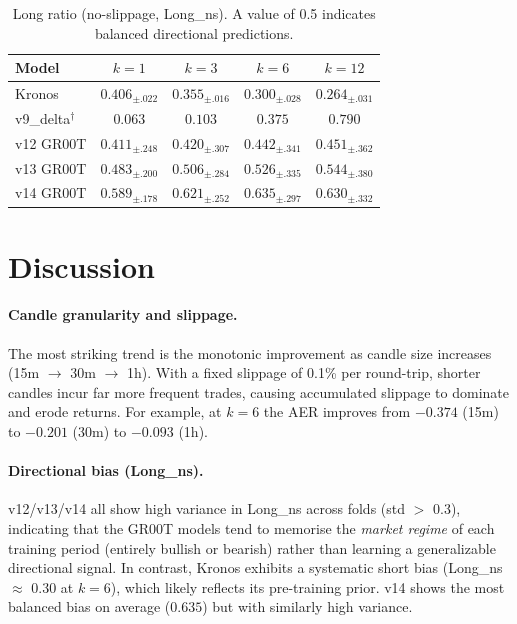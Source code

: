 \documentclass[11pt,a4paper]{article}
\newcommand{\refmark}{$^\dagger$}
\begin{document}
\begin{table}[h]
\centering
\caption{Long ratio (no-slippage, Long\_ns). A value of 0.5 indicates balanced directional predictions.}
\label{tab:lns}
\renewcommand{\arraystretch}{1.2}
\begin{tabular}{lcccc}
\toprule
\textbf{Model} & $k=1$ & $k=3$ & $k=6$ & $k=12$ \\
\midrule
\rowcolor{lightgray}
Kronos            & $0.406_{\pm.022}$ & $0.355_{\pm.016}$ & $0.300_{\pm.028}$ & $0.264_{\pm.031}$ \\
v9\_delta\refmark & $0.063$           & $0.103$           & $0.375$           & $0.790$           \\
v12 GR00T         & $0.411_{\pm.248}$ & $0.420_{\pm.307}$ & $0.442_{\pm.341}$ & $0.451_{\pm.362}$ \\
v13 GR00T         & $0.483_{\pm.200}$ & $0.506_{\pm.284}$ & $0.526_{\pm.335}$ & $0.544_{\pm.380}$ \\
v14 GR00T         & $0.589_{\pm.178}$ & $0.621_{\pm.252}$ & $0.635_{\pm.297}$ & $0.630_{\pm.332}$ \\
\bottomrule
\end{tabular}
\end{table}

\section{Discussion}

\paragraph{Candle granularity and slippage.}
The most striking trend is the monotonic improvement as candle size increases (15m $\to$ 30m $\to$ 1h).
With a fixed slippage of 0.1\% per round-trip, shorter candles incur far more frequent trades,
causing accumulated slippage to dominate and erode returns.
For example, at $k=6$ the AER improves from $-0.374$ (15m) to $-0.201$ (30m) to $-0.093$ (1h).

\paragraph{Directional bias (Long\_ns).}
v12/v13/v14 all show high variance in Long\_ns across folds (std $>$ 0.3),
indicating that the GR00T models tend to memorise the \emph{market regime} of each training period
(entirely bullish or bearish) rather than learning a generalizable directional signal.
In contrast, Kronos exhibits a systematic short bias (Long\_ns $\approx$ 0.30 at $k=6$),
which likely reflects its pre-training prior.
v14 shows the most balanced bias on average ($0.635$) but with similarly high variance.
\end{document}
